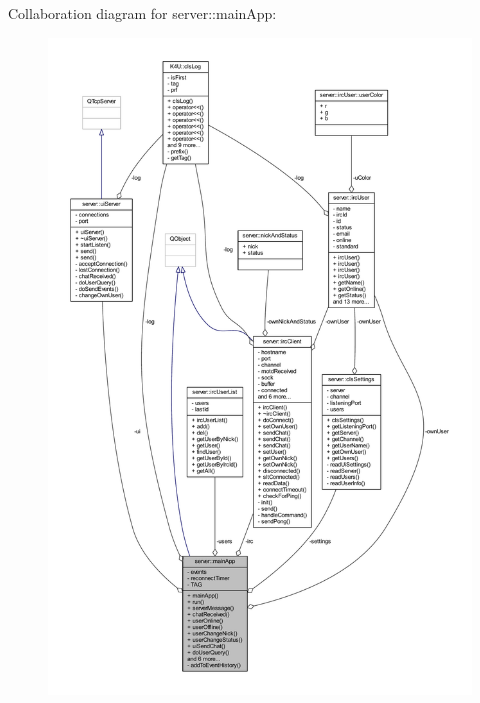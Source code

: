 Collaboration diagram for server\-:\-:main\-App\-:\nopagebreak
\begin{figure}[H]
\begin{center}
\leavevmode
\includegraphics[width=350pt]{dd/d48/classserver_1_1main_app__coll__graph}
\end{center}
\end{figure}
